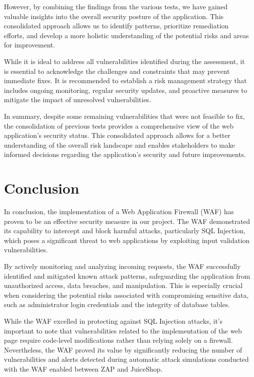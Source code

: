 \documentclass[12pt]{article}
\begin{document}
However, by combining the findings from the various tests, we have gained valuable insights into the overall security posture of the application. This consolidated approach allows us to identify patterns, prioritize remediation efforts, and develop a more holistic understanding of the potential risks and areas for improvement.

While it is ideal to address all vulnerabilities identified during the assessment, it is essential to acknowledge the challenges and constraints that may prevent immediate fixes. It is recommended to establish a risk management strategy that includes ongoing monitoring, regular security updates, and proactive measures to mitigate the impact of unresolved vulnerabilities.

In summary, despite some remaining vulnerabilities that were not feasible to fix, the consolidation of previous tests provides a comprehensive view of the web application's security status. This consolidated approach allows for a better understanding of the overall risk landscape and enables stakeholders to make informed decisions regarding the application's security and future improvements.

\newpage

\section{Conclusion}

In conclusion, the implementation of a Web Application Firewall (WAF) has proven to be an effective security measure in our project. The WAF demonstrated its capability to intercept and block harmful attacks, particularly SQL Injection, which poses a significant threat to web applications by exploiting input validation vulnerabilities.

By actively monitoring and analyzing incoming requests, the WAF successfully identified and mitigated known attack patterns, safeguarding the application from unauthorized access, data breaches, and manipulation. This is especially crucial when considering the potential risks associated with compromising sensitive data, such as administrator login credentials and the integrity of database tables.

While the WAF excelled in protecting against SQL Injection attacks, it's important to note that vulnerabilities related to the implementation of the web page require code-level modifications rather than relying solely on a firewall. Nevertheless, the WAF proved its value by significantly reducing the number of vulnerabilities and alerts detected during automatic attack simulations conducted with the WAF enabled between ZAP and JuiceShop.
\end{document}
